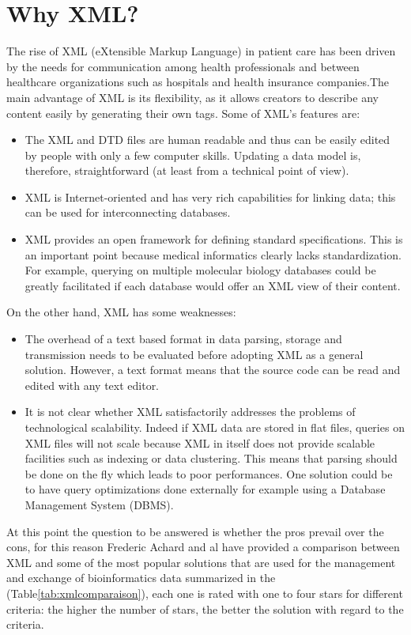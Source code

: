 \section{Why XML?}
The rise of XML (eXtensible Markup Language) in patient care has been driven by the needs for communication among health professionals and between healthcare organizations such as hospitals and health insurance companies.The main advantage of XML is its flexibility, as it allows creators to describe any content easily by generating their own tags\cite{thuy2012s}. Some of XML’s features are\cite{achard2001xml}:
\begin{itemize}
\renewcommand{\labelitemi}{$\bullet$}
\item The XML and DTD files are human readable and thus can be easily edited by people with only a few computer skills. Updating a data model is, therefore, straightforward (at least from a technical point of view).
\item XML is Internet-oriented and has very rich capabilities for linking data; this can be used for interconnecting databases.
\item XML provides an open framework for defining standard specifications. This is an important point because medical informatics clearly lacks standardization. For example, querying on multiple molecular biology databases could be greatly facilitated if each database would offer an XML view of their content.
\end{itemize}
On the other hand, XML has some weaknesses:
\begin{itemize}
\renewcommand{\labelitemi}{$\bullet$}
\item The overhead of a text based format in data parsing, storage and transmission needs to be evaluated before adopting XML as a general solution. However, a text format means that the source code can be read and edited with any text editor.
\item It is not clear whether XML satisfactorily addresses the problems of technological scalability. Indeed if XML data are stored in flat files, queries on XML files will not scale because XML in itself does not provide scalable facilities such as indexing or data clustering. This means that parsing should be done on the fly which leads to poor performances. One solution could be to have query optimizations done externally for example using a Database Management System (DBMS).
\end{itemize}
\bigbreak
At this point the question to be answered is whether the pros prevail over the cons, for this reason Frederic Achard and al\cite{achard2001xml}  have provided a comparison between XML and some of the most popular solutions that are used for the management and exchange of bioinformatics data summarized in the (Table\ref{tab:xmlcomparaison}), each one is rated with one to four stars for different criteria: the higher the number of stars, the better the solution with regard to the criteria.
